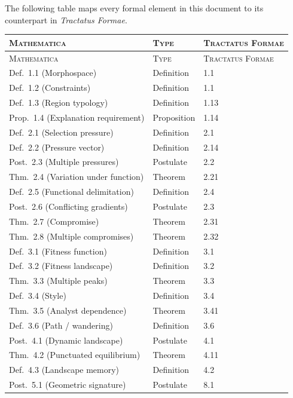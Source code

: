 \documentclass[10pt]{article}
\theoremstyle{definition}
\theoremstyle{plain}
\theoremstyle{remark}
\begin{document}
The following table maps every formal element in this document to its
counterpart in \textit{Tractatus Formae}.

\medskip
\begin{longtable}{@{}lll@{}}
\toprule
\textsc{Mathematica} & \textsc{Type} & \textsc{Tractatus Formae} \\
\midrule
\endfirsthead
\toprule
\textsc{Mathematica} & \textsc{Type} & \textsc{Tractatus Formae} \\
\midrule
\endhead
\bottomrule
\endfoot

Def.~1.1 (Morphospace) & Definition & 1.1 \\
Def.~1.2 (Constraints) & Definition & 1.1 \\
Def.~1.3 (Region typology) & Definition & 1.13 \\
Prop.~1.4 (Explanation requirement) & Proposition & 1.14 \\
\addlinespace
Def.~2.1 (Selection pressure) & Definition & 2.1 \\
Def.~2.2 (Pressure vector) & Definition & 2.14 \\
Post.~2.3 (Multiple pressures) & Postulate & 2.2 \\
Thm.~2.4 (Variation under function) & Theorem & 2.21 \\
Def.~2.5 (Functional delimitation) & Definition & 2.4 \\
Post.~2.6 (Conflicting gradients) & Postulate & 2.3 \\
Thm.~2.7 (Compromise) & Theorem & 2.31 \\
Thm.~2.8 (Multiple compromises) & Theorem & 2.32 \\
\addlinespace
Def.~3.1 (Fitness function) & Definition & 3.1 \\
Def.~3.2 (Fitness landscape) & Definition & 3.2 \\
Thm.~3.3 (Multiple peaks) & Theorem & 3.3 \\
Def.~3.4 (Style) & Definition & 3.4 \\
Thm.~3.5 (Analyst dependence) & Theorem & 3.41 \\
Def.~3.6 (Path / wandering) & Definition & 3.6 \\
\addlinespace
Post.~4.1 (Dynamic landscape) & Postulate & 4.1 \\
Thm.~4.2 (Punctuated equilibrium) & Theorem & 4.11 \\
Def.~4.3 (Landscape memory) & Definition & 4.2 \\
\addlinespace
Post.~5.1 (Geometric signature) & Postulate & 8.1 \\

\end{longtable}
\end{document}
